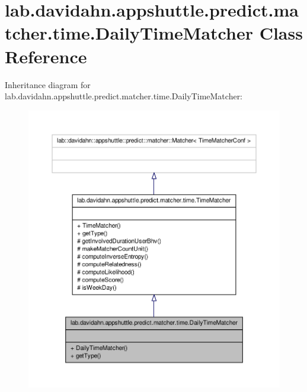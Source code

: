 \hypertarget{classlab_1_1davidahn_1_1appshuttle_1_1predict_1_1matcher_1_1time_1_1_daily_time_matcher}{\section{lab.\-davidahn.\-appshuttle.\-predict.\-matcher.\-time.\-Daily\-Time\-Matcher \-Class \-Reference}
\label{classlab_1_1davidahn_1_1appshuttle_1_1predict_1_1matcher_1_1time_1_1_daily_time_matcher}
}


\-Inheritance diagram for lab.\-davidahn.\-appshuttle.\-predict.\-matcher.\-time.\-Daily\-Time\-Matcher\-:
\nopagebreak
\begin{figure}[H]
\begin{center}
\leavevmode
\includegraphics[width=350pt]{classlab_1_1davidahn_1_1appshuttle_1_1predict_1_1matcher_1_1time_1_1_daily_time_matcher__inherit__graph}
\end{center}
\end{figure}


